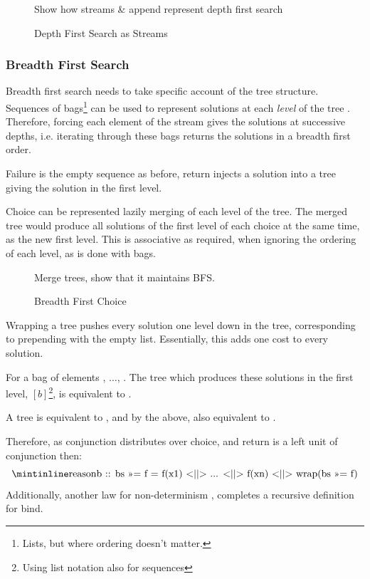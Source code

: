 \begin{figure}
Show how streams \& append represent depth first search
\caption{Depth First Search as Streams}
\end{figure}

\subsubsection{Breadth First Search}
Breadth first search needs to take specific account of the tree structure. Sequences of bags\footnote{Lists, but where ordering doesn't matter.} can be used to represent solutions at each \textit{level} of the tree \cite{BFSCombinators}. Therefore, forcing each element of the stream gives the solutions at successive depths, i.e. iterating through these bags returns the solutions in a breadth first order.

Failure is the empty sequence as before, return injects a solution into a tree giving the solution in the first level. 

Choice can be represented lazily merging of each level of the tree. The merged tree would produce all solutions of the first level of each choice at the same time, as the new first level. This is associative as required, when ignoring the ordering of each level, as is done with bags. 

\begin{figure}[h]
Merge trees, show that it maintains BFS.
\caption{Breadth First Choice}
\end{figure}

Wrapping a tree pushes every solution one level down in the tree, corresponding to prepending with the empty list. Essentially, this adds one cost to every solution.

For a bag  of elements ,  $\dots$, . The tree which produces these solutions in the first level, $[b]$\footnote{Using list notation also for sequences}, is equivalent to .

A tree  is equivalent to , and by the above, also equivalent to .

Therefore, as conjunction distributes over choice, and return is a left unit of conjunction then:
\[\code{b :: bs >>= f     =    f(x1) <||> ... <||> f(xn) <||> wrap(bs >>= f)}\]
Additionally, another law for non-determinism , completes a recursive definition for bind.

